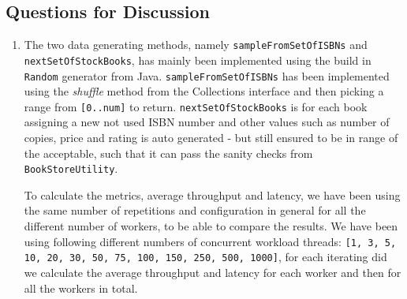 \documentclass[10pt,a4paper]{article}
\begin{document}
\subsection*{Questions for Discussion}
\begin{enumerate}
	\item The two data generating methods, namely \texttt{sampleFromSetOfISBNs} and \texttt{nextSetOfStockBooks}, has mainly been implemented using the build in \texttt{Random} generator from Java. \texttt{sampleFromSetOfISBNs} has been implemented using the \textit{shuffle} method from the Collections interface and then picking a range from \texttt{[0..num]} to return. \texttt{nextSetOfStockBooks} is for each book assigning a new not used ISBN number and other values such as number of copies, price and rating is auto generated - but still ensured to be in range of the acceptable, such that it can pass the sanity checks from \texttt{BookStoreUtility}.
	\newline
	
	To calculate the metrics, average throughput and latency, we have been using the same number of repetitions and configuration in general for all the different number of workers, to be able to compare the results. We have been using following different numbers of concurrent workload threads: \texttt{[1, 3, 5, 10, 20, 30, 50, 75, 100, 150, 250, 500, 1000]}, for each iterating did we calculate the average throughput and latency for each worker and then for all the workers in total.
	\newline
	

\end{enumerate}
\end{document}
